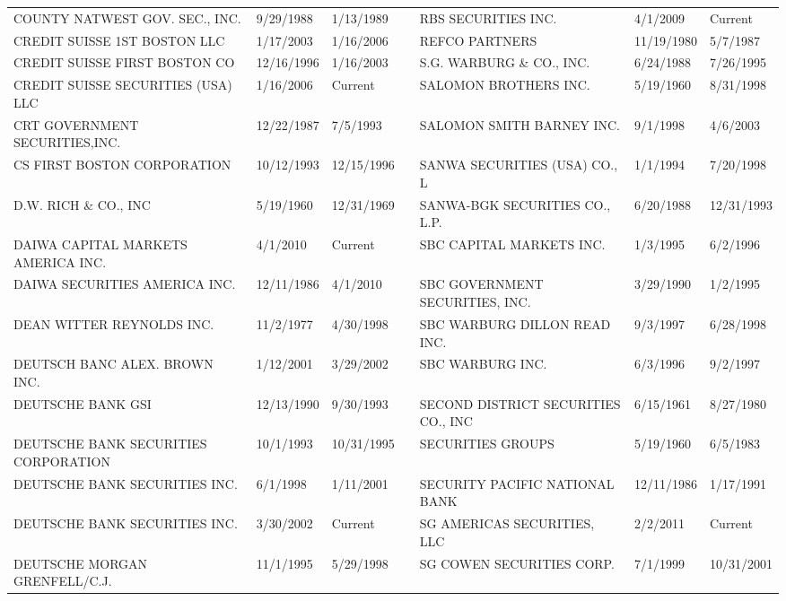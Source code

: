 \begin{tabular}{lllllll}
COUNTY NATWEST GOV. SEC., INC.       & 9/29/1988 & 1/13/1989 &  & RBS SECURITIES INC. & 4/1/2009 & Current \\
CREDIT SUISSE 1ST BOSTON LLC    & 1/17/2003 & 1/16/2006 &  & REFCO PARTNERS                      & 11/19/1980 & 5/7/1987 \\
CREDIT SUISSE FIRST BOSTON CO       & 12/16/1996 & 1/16/2003 &  & S.G. WARBURG \& CO., INC.             & 6/24/1988 & 7/26/1995 \\
CREDIT SUISSE SECURITIES (USA) LLC & 1/16/2006 & Current &  & SALOMON BROTHERS INC.               & 5/19/1960 & 8/31/1998 \\
CRT GOVERNMENT SECURITIES,INC.      & 12/22/1987 & 7/5/1993 &  & SALOMON SMITH BARNEY INC.       & 9/1/1998 & 4/6/2003 \\
CS FIRST BOSTON CORPORATION         & 10/12/1993 & 12/15/1996 &  & SANWA SECURITIES (USA) CO., L       & 1/1/1994 & 7/20/1998 \\
D.W. RICH \& CO., INC                 & 5/19/1960 & 12/31/1969 &  & SANWA-BGK SECURITIES CO., L.P.      & 6/20/1988 & 12/31/1993 \\
DAIWA CAPITAL MARKETS AMERICA INC. & 4/1/2010 & Current &  & SBC CAPITAL MARKETS INC.        & 1/3/1995 & 6/2/1996 \\
DAIWA SECURITIES AMERICA INC.       & 12/11/1986 & 4/1/2010 &  & SBC GOVERNMENT SECURITIES, INC. & 3/29/1990 & 1/2/1995 \\
DEAN WITTER REYNOLDS INC.           & 11/2/1977 & 4/30/1998 &  & SBC WARBURG DILLON READ INC.    & 9/3/1997 & 6/28/1998 \\
DEUTSCH BANC ALEX. BROWN INC.        & 1/12/2001 & 3/29/2002 &  & SBC WARBURG INC.                & 6/3/1996 & 9/2/1997 \\
DEUTSCHE BANK GSI                    & 12/13/1990 & 9/30/1993 &  & SECOND DISTRICT SECURITIES CO., INC  & 6/15/1961 & 8/27/1980 \\
DEUTSCHE BANK SECURITIES CORPORATION & 10/1/1993 & 10/31/1995 &  & SECURITIES GROUPS                    & 5/19/1960 & 6/5/1983 \\
DEUTSCHE BANK SECURITIES INC.        & 6/1/1998 & 1/11/2001 &  & SECURITY PACIFIC NATIONAL BANK       & 12/11/1986 & 1/17/1991 \\
DEUTSCHE BANK SECURITIES INC.        & 3/30/2002 & Current &  & SG AMERICAS SECURITIES, LLC & 2/2/2011 & Current \\
DEUTSCHE MORGAN GRENFELL/C.J.        & 11/1/1995 & 5/29/1998 &  & SG COWEN SECURITIES CORP.           & 7/1/1999 & 10/31/2001 \\

\end{tabular}
